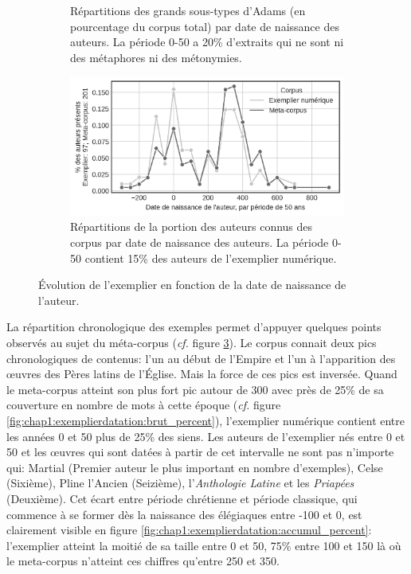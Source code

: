 {\begin{figure}
\begin{subfigure}{0.45\hsize}
        \caption{Répartitions des grands sous-types d'Adams (en pourcentage du corpus total) par date de naissance des auteurs. La période 0-50 a 20\% d'extraits qui ne sont ni des métaphores ni des métonymies.}
        \label{fig:chap1:exemplierdatation:tags}
    \end{subfigure}%
    \hfill
    \begin{subfigure}{0.45\hsize}
        \includegraphics[width=\linewidth]{figures/chap1/part3/exemplier/evol_auteurs_exemplier.png}
        \caption{Répartitions de la portion des auteurs connus des corpus par date de naissance des auteurs. La période 0-50 contient 15\% des auteurs de l'exemplier numérique.}
        \label{fig:chap1:exemplierdatation:auteurs}
    \end{subfigure}%
    \caption{Évolution de l'exemplier en fonction de la date de naissance de l'auteur.}
    \label{fig:chap1:exemplierdatation}
\end{figure}%
\clearpage
}

La répartition chronologique des exemples permet d'appuyer quelques points observés au sujet du méta-corpus (\textit{cf.} figure \ref{fig:chap1:exemplierdatation}). Le corpus connait deux pics chronologiques de contenus: l'un au début de l'Empire et l'un à l'apparition des œuvres des Pères latins de l'Église. Mais la force de ces pics est inversée. Quand le meta-corpus atteint son plus fort pic autour de 300 avec près de 25\% de sa couverture en nombre de mots à cette époque (\textit{cf.} figure \ref{fig:chap1:exemplierdatation:brut_percent}), l'exemplier numérique contient entre les années 0 et 50 plus de 25\% des siens. Les auteurs de l'exemplier nés entre 0 et 50 et les œuvres qui sont datées à partir de cet intervalle ne sont pas n'importe qui: Martial (Premier auteur le plus important en nombre d'exemples), Celse (Sixième), Pline l'Ancien (Seizième), l'\textit{Anthologie Latine} et les \textit{Priapées} (Deuxième). Cet écart entre période chrétienne et période classique, qui commence à se former dès la naissance des élégiaques entre -100 et 0, est clairement visible en figure \ref{fig:chap1:exemplierdatation:accumul_percent}: l'exemplier atteint la moitié de sa taille entre 0 et 50, 75\% entre 100 et 150 là où le meta-corpus n'atteint ces chiffres qu'entre 250 et 350.

